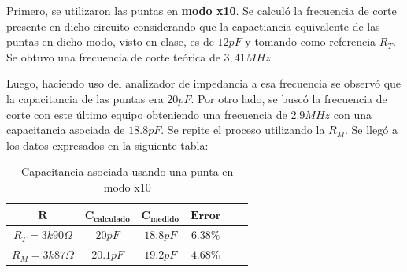 \documentclass[11pt, a4paper]{article}
\begin{document}
Primero, se utilizaron las puntas en \textbf{modo x10}. Se calculó la frecuencia de corte presente en dicho circuito considerando que la capactiancia equivalente de las puntas en dicho modo, visto en clase, es de $12 pF$ y tomando como referencia $R_T$. Se obtuvo una frecuencia de corte teórica de $3,41MHz$. \par 
Luego, haciendo uso del analizador de impedancia a esa frecuencia se observó que la capacitancia de las puntas era $20 pF$. Por otro lado, se buscó la frecuencia de corte con este último equipo obteniendo una frecuencia de $2.9 MHz$ con una capacitancia asociada de $18.8pF$. Se repite el proceso utilizando la $R_M$. Se llegó a los datos expresados en la siguiente tabla:
 \begin{center}
     \begin{table}[ht]
     \centering
	 \renewcommand{\arraystretch}{1.1}
         \begin{tabular}{c c c c c c}
            \hline 
             $\bm{R}$ &  $\bm{C_{calculado}}$ &    $\bm{C_{medido}}$   &  $\bm{Error}$\\ \hline
             $R_T = 3k90\Omega$  & $20 pF$ & $18.8 pF$ & $6.38\%$ \\  
             $R_M = 3k87\Omega$ & $20.1 pF$ & $19.2 pF$ & $4.68 \%$ \\   \hline
        \end{tabular}
        \caption{Capacitancia asociada usando una punta en modo x10}
        \label{table:valores_punta_x10}
    \end{table}
\end{center}
\end{document}
